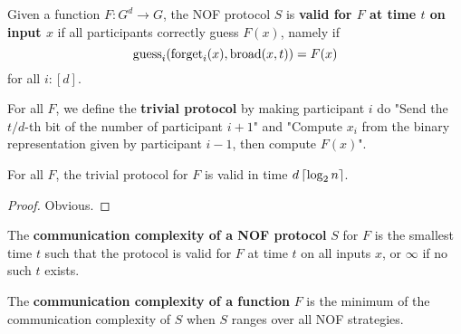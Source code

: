 \begin{definition}
  \label{def:valid-protocol}
  \leanok

  Given a function $F : G^d \to G$, the NOF protocol $S$ is {\bf valid for $F$ at time $t$ on input $x$} if all participants correctly guess $F(x)$, namely if
  $$\operatorname{guess}_i(\operatorname{forget}_i(x), \operatorname{broad}(x, t)) = F(x)$$
  for all $i : [d]$.
\end{definition}

\begin{definition}
  \label{def:trivial-protocol}

  For all $F$, we define the {\bf trivial protocol} by making participant $i$ do "Send the $t / d$-th bit of the number of participant $i + 1$" and "Compute $x_i$ from the binary representation given by participant $i - 1$, then compute $F(x)$".
\end{definition}

\begin{lemma}
  \label{lem:trivial-protocol-valid}

  For all $F$, the trivial protocol for $F$ is valid in time $d\left\lceil \log_2 n\right\rceil$.
\end{lemma}
\begin{proof}

  Obvious.
\end{proof}

\begin{definition}
  \label{def:protocol-complexity}
  \leanok

  The {\bf communication complexity of a NOF protocol} $S$ for $F$ is the smallest time $t$ such that the protocol is valid for $F$ at time $t$ on all inputs $x$, or $\infty$ if no such $t$ exists.
\end{definition}

\begin{definition}
  \label{def:function-complexity}
  \leanok

  The {\bf communication complexity of a function} $F$ is the minimum of the communication complexity of $S$ when $S$ ranges over all NOF strategies.
\end{definition}

